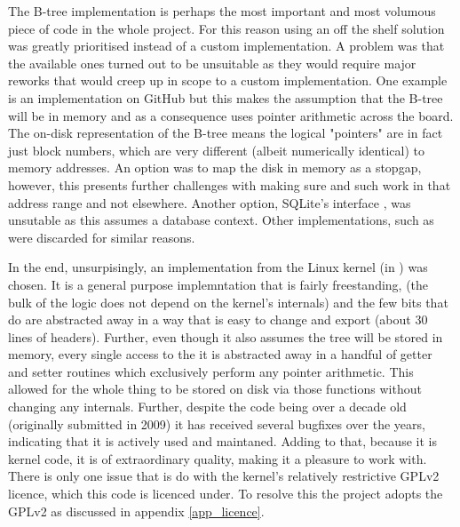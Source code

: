         The B-tree implementation is perhaps the most important and most
        volumous piece of code in the whole project. For this reason using an
        off the shelf solution was greatly prioritised instead of a custom
        implementation. A problem was that the available ones turned out to be
        unsuitable as they would require major reworks that would creep up in
        scope to a custom implementation. One example is an implementation on
        GitHub \cite{GitHub_btree} but this makes the assumption that the
        B-tree will be in memory and as a consequence uses pointer arithmetic
        across the board. The on-disk representation of the B-tree means the
        logical "pointers" are in fact just block numbers, which are very
        different (albeit numerically identical) to memory addresses. An option
        was to map the disk in memory as a stopgap, however, this presents
        further challenges with making sure  and such work in
        that address range and not elsewhere. Another option, SQLite's
        interface \cite{SQLite_btree}, was unsutable as this assumes a database
        context. Other implementations, such as \cite{random_btree} were
        discarded for similar reasons.

        In the end, unsurpisingly, an implementation from the Linux kernel (in
         \cite{Linux_source}) was chosen. It is a
        general purpose \bplustree implemntation that is fairly freestanding,
        (the bulk of the logic does not depend on the kernel's internals) and
        the few bits that do are abstracted away in a way that is easy to
        change and export (about 30 lines of headers). Further, even though it
        also assumes the tree will be stored in memory, every single access to
        the it is abstracted away in a handful of getter and setter routines
        which exclusively perform any pointer arithmetic. This allowed for the
        whole thing to be stored on disk via those functions without changing
        any internals. Further, despite the code being over a decade old
        (originally submitted in 2009) it has received several bugfixes over
        the years, indicating that it is actively used and maintaned. Adding to
        that, because it is kernel code, it is of extraordinary quality, making
        it a pleasure to work with. There is only one issue that is do with the
        kernel's relatively restrictive GPLv2 licence, which this code is
        licenced under. To resolve this the project adopts the GPLv2 as
        discussed in appendix \ref{app_licence}.

